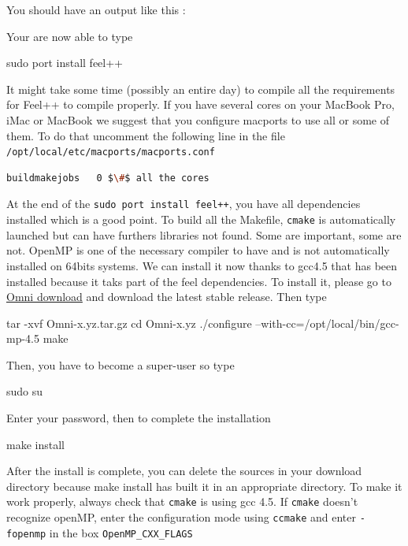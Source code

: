 \documentclass[a4paper]{book}
\newcommand{\cmake}{\texttt{cmake}\xspace}
\newcommand{\ccmake}{\texttt{ccmake}\xspace}
\begin{document}
You should have an output like this : 
\begin{flushleft}
\end{flushleft}
Your are now able to type 
\begin{unixcom}
		sudo port install feel++
\end{unixcom}
It might take some time (possibly an entire day) to compile all the requirements for Feel++
to compile properly. If you have several cores on your MacBook Pro, iMac or MacBook
we suggest that you configure macports to use all or some of them.
To do that uncomment the following line in the file \newline \verb|/opt/local/etc/macports/macports.conf|
\begin{flushleft}
\begin{lstlisting}[language=sh]
buildmakejobs	0 $\#$ all the cores
\end{lstlisting} 
\end{flushleft}
At the end of the \verb|sudo port install feel++|, you have all dependencies installed which is a good point. To build all the Makefile, \cmake is automatically launched but can have furthers libraries not found. Some are important, some are not. OpenMP is one of the necessary compiler to have and is not automatically installed on 64bits systems. We can install it now thanks to gcc4.5 that has been installed because it taks part of the feel dependencies. To install it, please go to \href{http://www.hpcs.cs.tsukuba.ac.jp/omni-openmp/download/download-omni.html}{Omni download} and download the latest stable release. Then type
\begin{unixcom}
		tar -xvf Omni-x.yz.tar.gz 
		cd  Omni-x.yz
		./configure --with-cc=/opt/local/bin/gcc-mp-4.5
		make
\end{unixcom}
Then, you have to become a super-user so type
\begin{unixcom}
		sudo su
\end{unixcom}
Enter your password, then to complete the installation 
\begin{unixcom}
		make install
\end{unixcom}
After the install is complete, you can delete the sources in your download directory because make install has built it in an appropriate directory. To make it work properly, always check that \cmake is using gcc 4.5. If \cmake doesn't recognize openMP, enter the configuration mode using \ccmake and enter \verb|-fopenmp| in the box \verb|OpenMP_CXX_FLAGS|
\end{document}
